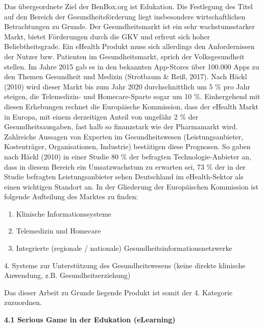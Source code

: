 \documentclass[
  a4paper,
  DIV=11,
  numbers=noendperiod,
  onecolumn,
  oneside,
  a4paper]{scrartcl}
\providecommand{\tightlist}{%
  \setlength{\itemsep}{0pt}\setlength{\parskip}{0pt}}
\begin{document}
Das übergeordnete Ziel der BenBox.org ist Edukation. Die Festlegung des
Titel auf den Bereich der Gesundheitsförderung liegt insbesondere
wirtschaftlichen Betrachtungen zu Grunde. Der Gesundheitsmarkt ist ein
sehr wachstumsstarker Markt, bietet Förderungen durch die GKV und
erfreut sich hoher Beliebtheitsgrade. Ein eHealth Produkt muss sich
allerdings den Anfordernissen der Nutzer bzw. Patienten im
Gesundheitsmarkt, sprich der Volksgesundheit stellen. Im Jahre 2015 gab
es in den bekannten App-Stores über 100.000 Apps zu den Themen
Gesundheit und Medizin (Strotbaum \& Reiß, 2017). Nach Häckl (2010) wird
dieser Markt bis zum Jahr 2020 durchschnittlich um 5 \% pro Jahr
steigen, die Telemedizin- und Homecare-Sparte sogar um 10 \%.
Einhergehend mit diesen Erhebungen rechnet die Europäische Kommission,
dass der eHealth Markt in Europa, mit einem derzeitigen Anteil von
ungefähr 2 \% der Gesundheitsausgaben, fast halb so finanzstark wie der
Pharmamarkt wird. Zahlreiche Aussagen von Experten im Gesundheitswesen
(Leistungsanbieter, Kostenträger, Organisationen, Industrie) bestätigen
diese Prognosen. So gaben nach Häckl (2010) in einer Studie 80 \% der
befragten Technologie-Anbieter an, dass in diesem Bereich ein
Umsatzwachstum zu erwarten sei, 73 \% der in der Studie befragten
Leistungsanbieter sehen Deutschland im eHealth-Sektor als einen
wichtigen Standort an. In der Gliederung der Europäischen Kommission ist
folgende Aufteilung des Marktes zu finden:

\begin{enumerate}
\def\labelenumi{\arabic{enumi}.}
\tightlist
\item
  Klinische Informationssysteme
\item
  Telemedizin und Homecare
\item
  Integrierte (regionale / nationale) Gesundheitsinformationsnetzwerke
\end{enumerate}

4. Systeme zur Unterstützung des Gesundheitswesens (keine direkte
klinische Anwendung, z.B. Gesundheitserziehung)

Das dieser Arbeit zu Grunde liegende Produkt ist somit der 4. Kategorie
zuzuordnen.

\textbf{4.1 Serious Game in der Edukation (eLearning)}
\end{document}

